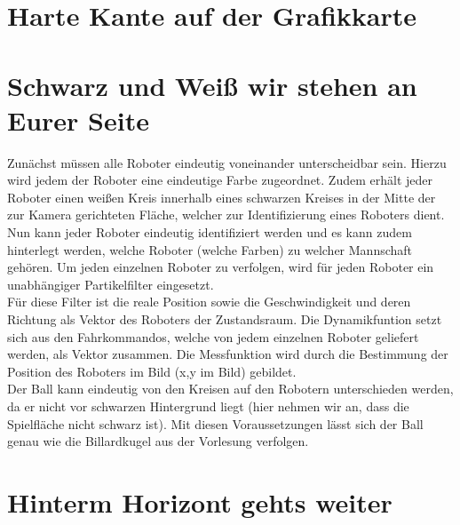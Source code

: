 \documentclass{ezb}
\begin{document}

\section{Harte Kante auf der Grafikkarte}
\section{Schwarz und Weiß wir stehen an Eurer Seite}
Zunächst müssen alle Roboter eindeutig voneinander unterscheidbar sein. Hierzu wird jedem der Roboter eine eindeutige Farbe zugeordnet. Zudem erhält jeder Roboter einen weißen Kreis innerhalb eines schwarzen Kreises in der Mitte der zur Kamera gerichteten Fläche, welcher zur Identifizierung eines Roboters dient.\\
Nun kann jeder Roboter eindeutig identifiziert werden und es kann zudem hinterlegt werden, welche Roboter (welche Farben) zu welcher Mannschaft gehören.
Um jeden einzelnen Roboter zu verfolgen, wird für jeden Roboter ein unabhängiger Partikelfilter eingesetzt.\\
Für diese Filter ist die reale Position sowie die Geschwindigkeit und deren Richtung als Vektor des Roboters der Zustandsraum. Die Dynamikfuntion setzt sich aus den Fahrkommandos, welche von jedem einzelnen Roboter geliefert werden, als Vektor zusammen. Die Messfunktion wird durch die Bestimmung der Position des Roboters im Bild (x,y im Bild) gebildet.\\
Der Ball kann eindeutig von den Kreisen auf den Robotern unterschieden werden, da er nicht vor schwarzen Hintergrund liegt (hier nehmen wir an, dass die Spielfläche nicht schwarz ist). Mit diesen Voraussetzungen lässt sich der Ball genau wie die Billardkugel aus der Vorlesung verfolgen.
\section{Hinterm Horizont gehts weiter}


\end{document}
